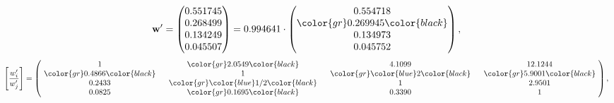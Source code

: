\begin{example}
\begin{equation*}
\mathbf{w}^{\prime} =
\begin{pmatrix}
0.551745\\
0.268499\\
0.134249\\
0.045507
\end{pmatrix} =
0.994641\cdot
\begin{pmatrix}
0.554718\\
\color{gr} 0.269945\color{black} \\
0.134973\\
0.045752
\end{pmatrix},
\end{equation*}
\begin{equation*}
\left[ \frac{{w}^{\prime}_i}{{w}^{\prime}_j} \right] =
\begin{pmatrix}
$\,\,$ 1 $\,\,$ & $\,\,$\color{gr} 2.0549\color{black} $\,\,$ & $\,\,$4.1099$\,\,$ & $\,\,$12.1244$\,\,$ \\
$\,\,$\color{gr} 0.4866\color{black} $\,\,$ & $\,\,$ 1 $\,\,$ & $\,\,$\color{gr} \color{blue} 2\color{black} $\,\,$ & $\,\,$\color{gr} 5.9001\color{black}   $\,\,$ \\
$\,\,$0.2433$\,\,$ & $\,\,$\color{gr} \color{blue}  1/2\color{black} $\,\,$ & $\,\,$ 1 $\,\,$ & $\,\,$2.9501 $\,\,$ \\
$\,\,$0.0825$\,\,$ & $\,\,$\color{gr} 0.1695\color{black} $\,\,$ & $\,\,$0.3390$\,\,$ & $\,\,$ 1  $\,\,$ \\
\end{pmatrix},
\end{equation*}
\end{example}
\newpage
